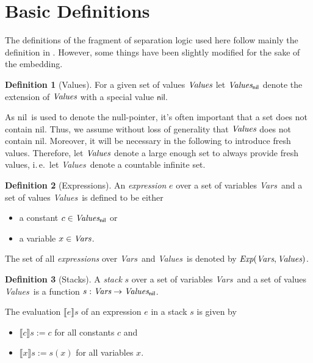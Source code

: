 \documentclass{scrartcl}
\theoremstyle{definition}
\newtheorem{definition}{Definition}
\newcommand{\nil}{{\textsf{nil}}}
\newcommand{\values}{{\emph{Values}}}
\newcommand{\valuesnil}{\ensuremath{\values_\nil}}
\newcommand{\vars}{{\emph{Vars}}}
\newcommand{\expr}{{\emph{Exp}}}
\begin{document}
\section{Basic Definitions}

The definitions of the fragment of separation logic used here follow mainly the definition in
\cite{berdine05symbolic}. However, some things have been slightly modified for the
sake of the embedding.

\begin{definition}[Values]
  For a given set of values $\values$ let $\valuesnil$ 
  denote the extension of $\values$ with a special value $\nil$.

  As \nil\ is used to denote the null-pointer, it's often important that a set
  does not contain \nil. Thus, we assume without loss of generality that
  $\values$ does not contain \nil. Moreover, it will be necessary in the
  following to introduce fresh values. Therefore, let $\values$ denote a large
  enough set to always provide fresh values, i.\,e.\ let \values\ denote a
  countable infinite set.
\end{definition}

\begin{definition}[Expressions]
  An \emph{expression} $e$ over a set of variables \vars\ and a set of values
  \values\ is defined to be either
\begin{itemize}
\item a constant $c \in \valuesnil$ or
\item a variable $x \in \vars$.
\end{itemize}
%
The set of all \emph{expressions} over \vars\ and \values\ is denoted by
$\expr(\vars,\values)$.
\end{definition}


\begin{definition}[Stacks]
  A \emph{stack} $s$ over a set of variables \vars\ and a set of values
  \values\ is a function $s: \vars \to \valuesnil$.

  The evaluation $\llbracket e \rrbracket s$ of an expression $e$ in a stack
  $s$ is given by
 \begin{itemize}
\item $\llbracket c \rrbracket s := c$ for all constants $c$ and
\item $\llbracket x \rrbracket s := s(x)$ for all variables $x$.
\end{itemize}
\end{definition}
\end{document}
